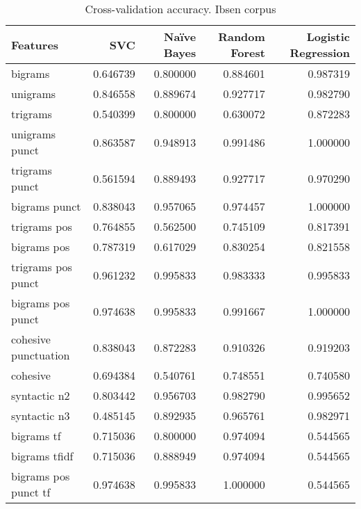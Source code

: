 \documentclass{article}
\begin{document}
\begin{table}
\centering
\caption{Cross-validation accuracy. Ibsen corpus}
\begin{tabular}{lrrrr}
\toprule
{Features} &       SVC &  Naïve Bayes &  Random Forest &  Logistic Regression \\
\midrule
bigrams                    &  0.646739 &     0.800000 &       0.884601 &             0.987319 \\
unigrams                   &  0.846558 &     0.889674 &       0.927717 &             0.982790 \\
trigrams                   &  0.540399 &     0.800000 &       0.630072 &             0.872283 \\
unigrams punct             &  0.863587 &     0.948913 &       0.991486 &             1.000000 \\
trigrams punct             &  0.561594 &     0.889493 &       0.927717 &             0.970290 \\
bigrams punct              &  0.838043 &     0.957065 &       0.974457 &             1.000000 \\
trigrams pos               &  0.764855 &     0.562500 &       0.745109 &             0.817391 \\
bigrams pos                &  0.787319 &     0.617029 &       0.830254 &             0.821558 \\
trigrams pos punct         &  0.961232 &     0.995833 &       0.983333 &             0.995833 \\
bigrams pos punct          &  0.974638 &     0.995833 &       0.991667 &             1.000000 \\
cohesive punctuation       &  0.838043 &     0.872283 &       0.910326 &             0.919203 \\
cohesive                   &  0.694384 &     0.540761 &       0.748551 &             0.740580 \\
syntactic n2               &  0.803442 &     0.956703 &       0.982790 &             0.995652 \\
syntactic n3               &  0.485145 &     0.892935 &       0.965761 &             0.982971 \\
bigrams tf                 &  0.715036 &     0.800000 &       0.974094 &             0.544565 \\
bigrams tfidf              &  0.715036 &     0.888949 &       0.974094 &             0.544565 \\
bigrams pos punct tf       &  0.974638 &     0.995833 &       1.000000 &             0.544565 \\

\end{tabular}
\end{table}
\end{document}
